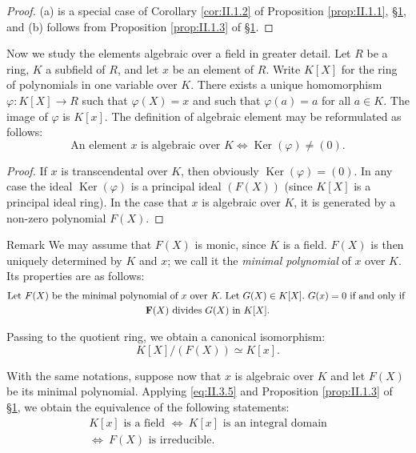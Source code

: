 \begin{proof}
(a) is a special case of Corollary \ref{cor:II.1.2} of Proposition
\ref{prop:II.1.1}, \hyperref[sec:2.1]{§1}, and (b) follows from Proposition \ref{prop:II.1.3} of
\hyperref[sec:2.1]{§1}.
\end{proof}

Now we study the elements algebraic over a field in greater detail. Let $R$
be a ring, $K$ a subfield of $R$, and let $x$ be an element of $R$. Write
$K[X]$ for the ring of polynomials in one variable over $K$. There exists a
unique homomorphism $\varphi:K[X]\to R$ such that $\varphi(X)=x$ and such
that $\varphi(a)=a$ for all $a\in K$. The image of $\varphi$ is $K[x]$. The
definition of algebraic element may be reformulated as follows:
\begin{equation}
\text{An element }x\text{ is algebraic over }K\Leftrightarrow
\operatorname{Ker}(\varphi)\neq(0).
\label{eq:II.3.4}
\end{equation}

\begin{proof}
If $x$ is transcendental over $K$, then obviously
$\operatorname{Ker}(\varphi)=(0)$. In any case the ideal
$\operatorname{Ker}(\varphi)$ is a principal ideal $(F(X))$ (since $K[X]$ is
a principal ideal ring). In the case that $x$ is algebraic over $K$, it is
generated by a non-zero polynomial $F(X)$.
\end{proof}

\begin{statement}{Remark}
We may assume that $F(X)$ is monic, since $K$ is a field. $F(X)$ is then
uniquely determined by $K$ and $x$; we call it the \emph{minimal polynomial}
of $x$ over $K$. Its properties are as follows:
\begin{equation}
\begin{gathered}
\text{Let }F(X)\text{ be the minimal polynomial of }x\text{ over }K.
\text{ Let }G(X)\in K[X].\ G(x)=0\text{ if and only if }\\
\mathbf{F}(X)\text{ divides }G(X)\text{ in }K[X].
\end{gathered}
\label{eq:II.3.5}
\end{equation}
\end{statement}

Passing to the quotient ring, we obtain a canonical isomorphism:
\begin{equation}
K[X]/(F(X))\simeq K[x].
\label{eq:II.3.6}
\end{equation}

With the same notations, suppose now that $x$ is algebraic over $K$ and let
$F(X)$ be its minimal polynomial. Applying \eqref{eq:II.3.5} and Proposition
\ref{prop:II.1.3} of \hyperref[sec:2.1]{§1}, we obtain the equivalence of the following
statements:
\begin{equation}
\begin{gathered}
K[x]\text{ is a field }\Leftrightarrow\ K[x]\text{ is an integral domain}\\
\Leftrightarrow\ F(X)\text{ is irreducible.}
\end{gathered}
\label{eq:II.3.7}
\end{equation}

